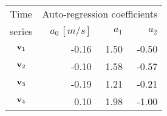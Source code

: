 \begin{tabular}{crrr}
    \toprule
    Time    & \multicolumn{3}{c}{Auto-regression coefficients} \\
    series & $a_0\,[\unit{m/s}]$ & $a_1$ & $a_2$ \\ \otoprule
    $\textbf{v}_{1}$ & -0.16 & 1.50 & -0.50 \\
    $\textbf{v}_{2}$ & -0.10 & 1.58 & -0.57 \\
    $\textbf{v}_{3}$ & -0.19 & 1.21 & -0.21 \\
    $\textbf{v}_{4}$ & 0.10 & 1.98 & -1.00 \\
    \bottomrule
\end{tabular}
